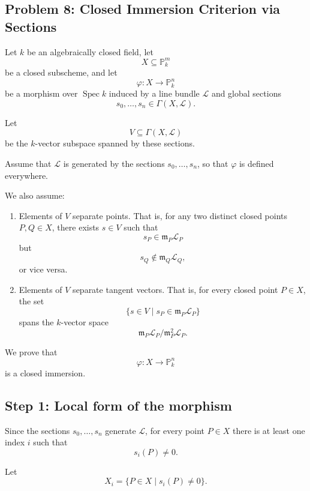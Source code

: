 
\subsection*{Problem 8: Closed Immersion Criterion via Sections}

Let $k$ be an algebraically closed field, let
\[
X\subseteq \mathbb P_k^m
\]
be a closed subscheme, and let
\[
\varphi:X\to \mathbb P_k^n
\]
be a morphism over $\operatorname{Spec}k$ induced by a line bundle
$\mathcal L$ and global sections
\[
s_0,\ldots,s_n\in \Gamma(X,\mathcal L).
\]

Let
\[
V\subseteq \Gamma(X,\mathcal L)
\]
be the $k$-vector subspace spanned by these sections.

Assume that $\mathcal L$ is generated by the sections $s_0,\ldots,s_n$,
so that $\varphi$ is defined everywhere.

We also assume:

\begin{enumerate}
	\item Elements of $V$ separate points.
	That is, for any two distinct closed points $P,Q\in X$, there exists
	$s\in V$ such that
	\[
	s_P\in \mathfrak m_P\mathcal L_P
	\]
	but
	\[
	s_Q\notin \mathfrak m_Q\mathcal L_Q,
	\]
	or vice versa.
	
	\item Elements of $V$ separate tangent vectors.
	That is, for every closed point $P\in X$, the set
	\[
	\{s\in V\mid s_P\in \mathfrak m_P\mathcal L_P\}
	\]
	spans the $k$-vector space
	\[
	\mathfrak m_P\mathcal L_P/\mathfrak m_P^2\mathcal L_P.
	\]
\end{enumerate}

We prove that
\[
\varphi:X\to \mathbb P_k^n
\]
is a closed immersion.

\subsection*{Step 1: Local form of the morphism}

Since the sections $s_0,\ldots,s_n$ generate $\mathcal L$, for every point
$P\in X$ there is at least one index $i$ such that
\[
s_i(P)\neq0.
\]

Let
\[
X_i=\{P\in X\mid s_i(P)\neq0\}.
\]

